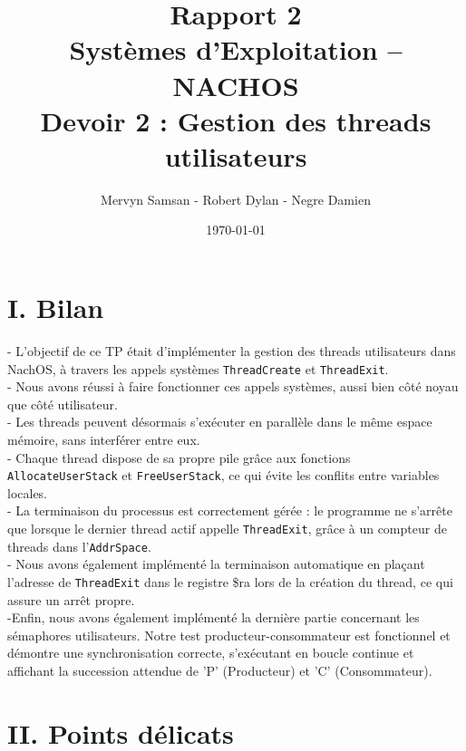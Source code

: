 \documentclass[12pt,a4paper]{report}
\title{\Huge Rapport 2 \\[0.5cm]
\Large Systèmes d'Exploitation – NACHOS \\[0.2cm]
\large Devoir 2 : Gestion des threads utilisateurs}
\author{Mervyn Samsan - Robert Dylan - Negre Damien}
\date{\today}
\begin{document}
\maketitle
\newpage

\section*{I. Bilan}

- L’objectif de ce TP était d’implémenter la gestion des threads utilisateurs dans NachOS, à travers les appels systèmes \texttt{ThreadCreate} et \texttt{ThreadExit}. \\
- Nous avons réussi à faire fonctionner ces appels systèmes, aussi bien côté noyau que côté utilisateur. \\
- Les threads peuvent désormais s’exécuter en parallèle dans le même espace mémoire, sans interférer entre eux. \\
- Chaque thread dispose de sa propre pile grâce aux fonctions \texttt{AllocateUserStack} et \texttt{FreeUserStack}, ce qui évite les conflits entre variables locales. \\
- La terminaison du processus est correctement gérée : le programme ne s’arrête que lorsque le dernier thread actif appelle \texttt{ThreadExit}, grâce à un compteur de threads dans l’\texttt{AddrSpace}. \\
- Nous avons également implémenté la terminaison automatique en plaçant l’adresse de \texttt{ThreadExit} dans le registre \$ra lors de la création du thread, ce qui assure un arrêt propre. \\
-Enfin, nous avons également implémenté la dernière partie concernant les sémaphores utilisateurs. Notre test producteur-consommateur est fonctionnel et démontre une synchronisation correcte, s'exécutant en boucle continue et affichant la succession attendue de 'P' (Producteur) et 'C' (Consommateur). \\

\section*{II. Points délicats}
\end{document}
